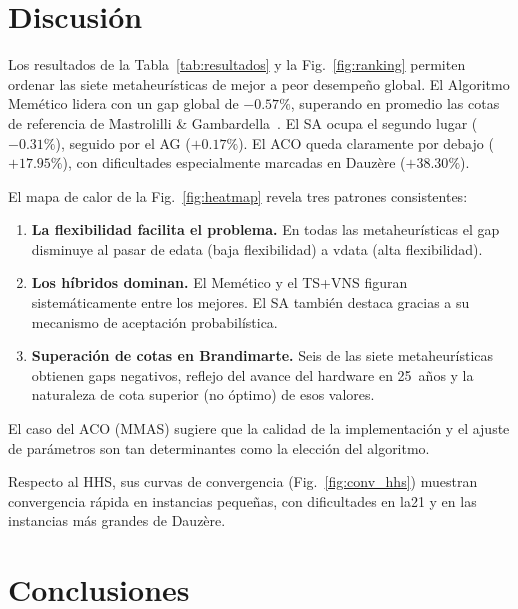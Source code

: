 \documentclass[conference]{IEEEtran}
\begin{document}
\section{Discusi\'on}
\label{sec:discusion}

Los resultados de la Tabla~\ref{tab:resultados} y la
Fig.~\ref{fig:ranking} permiten ordenar las siete metaheur\'isticas
de mejor a peor desempe\~no global.
El Algoritmo Mem\'etico lidera con un gap global de $-0.57\%$,
superando en promedio las cotas de referencia de
Mastrolilli \& Gambardella~\cite{mastrolilli2000}.
El SA ocupa el segundo lugar ($-0.31\%$), seguido por el AG
($+0.17\%$).
El ACO queda claramente por debajo ($+17.95\%$), con dificultades
especialmente marcadas en Dauz\`ere ($+38.30\%$).

El mapa de calor de la Fig.~\ref{fig:heatmap} revela tres patrones
consistentes:

\begin{enumerate}
  \item \textbf{La flexibilidad facilita el problema.}
        En todas las metaheur\'isticas el gap disminuye al pasar de
        edata (baja flexibilidad) a vdata (alta flexibilidad).

  \item \textbf{Los h\'ibridos dominan.}
        El Mem\'etico y el TS+VNS figuran sistem\'aticamente entre
        los mejores. El SA tambi\'en destaca gracias a su mecanismo
        de aceptaci\'on probabil\'istica.

  \item \textbf{Superaci\'on de cotas en Brandimarte.}
        Seis de las siete metaheur\'isticas obtienen gaps negativos,
        reflejo del avance del hardware en 25~a\~nos y la naturaleza
        de cota superior (no \'optimo) de esos valores.
\end{enumerate}

El caso del ACO (MMAS) sugiere que la calidad de la implementaci\'on
y el ajuste de par\'ametros son tan determinantes como la elecci\'on
del algoritmo.

Respecto al HHS, sus curvas de convergencia (Fig.~\ref{fig:conv_hhs})
muestran convergencia r\'apida en instancias peque\~nas, con
dificultades en la21 y en las instancias m\'as grandes de Dauz\`ere.

\section{Conclusiones}
\label{sec:conclusiones}
\end{document}
